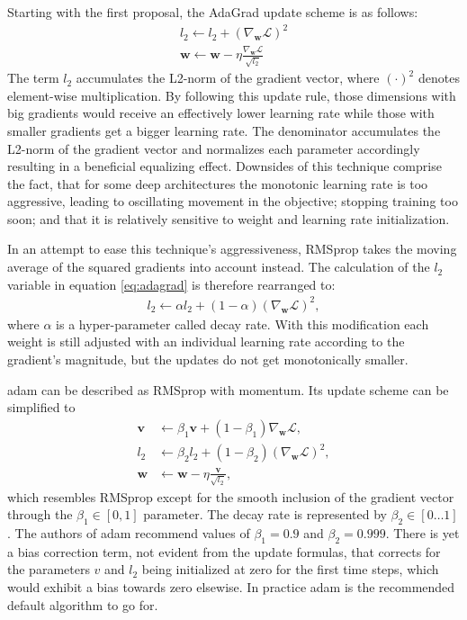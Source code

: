 Starting with the first proposal, the AdaGrad update scheme is as follows:
\begin{align}
	l_2\gets l_2 + (\nabla_{\bm w}\mathcal L)^2\label{eq:adagrad}\\
	\bm w\gets\bm w - \eta\frac{\nabla_{\bm w}\mathcal L}{\sqrt{l_2}}
\end{align}
The term $l_2$ accumulates the L2-norm of the gradient vector, where $ (\cdot)^2$ denotes element-wise multiplication.
By following this update rule, those dimensions with big gradients would receive an effectively lower learning rate while those with smaller gradients get a bigger learning rate.
The denominator accumulates the L2-norm of the gradient vector and normalizes each parameter accordingly resulting in a beneficial equalizing effect.
Downsides of this technique comprise the fact, that for some deep architectures the monotonic learning rate is too aggressive, leading to oscillating movement in the objective; stopping training too soon; and that it is relatively sensitive to weight and learning rate initialization.

In an attempt to ease this technique's aggressiveness, RMSprop takes the moving average of the squared gradients into account instead.
The calculation of the $l_2$ variable in equation \ref{eq:adagrad} is therefore rearranged to:
\begin{align}
	l_2\gets\alpha l_2 + (1 - \alpha)(\nabla_{\bm w}\mathcal L)^2,
\end{align}
where $\alpha$ is a hyper-parameter called decay rate.
With this modification each weight is still adjusted with an individual learning rate according to the gradient's magnitude, but the updates do not get monotonically smaller. 

\gls{adam} can be described as RMSprop with momentum.
Its update scheme can be simplified to
\begin{align}
	\bm v&\gets\beta_1\bm v + (1-\beta_1)\nabla_{\bm w}\mathcal L,\\
	l_2&\gets\beta_2l_2 + (1-\beta_2)(\nabla_{\bm w}\mathcal L)^2,\\
	\bm w&\gets\bm w - \eta\frac{\bm v}{\sqrt{l_2}},
\end{align}
which resembles RMSprop except for the smooth inclusion of the gradient vector through the $\beta_1\in{[0, 1]}$ parameter.
The decay rate is represented by $\beta_2\in{[0\dots1]}$.
The authors of \gls{adam} recommend values of $\beta_1=0.9$ and $\beta_2=0.999$.
There is yet a bias correction term, not evident from the update formulas, that corrects for the parameters $v$ and $l_2$ being initialized at zero for the first time steps, which would exhibit a bias towards zero elsewise.
In practice \gls{adam} is the recommended default algorithm to go for.

